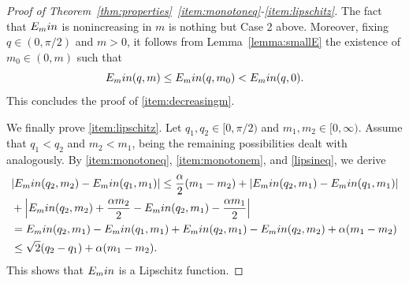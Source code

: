 \documentclass[10pt,a4paper]{amsart}
\newcommand{\Emin}{E_\textup{min}}
\begin{document}
\begin{proof}[Proof of Theorem~\ref{thm:properties}~\ref{item:monotoneq}-\ref{item:lipschitz}]
The fact that $\Emin$ is nonincreasing in $m$ is nothing but Case 2 above. Moreover, fixing $q\in(0,\pi/2)$ and $m>0$, it follows from Lemma~\ref{lemma:smallE} the existence of $m_0\in (0,m)$ such that
\[\Emin(q,m)\leq\Emin(q,m_0)<\Emin(q,0).\]
This concludes the proof of \ref{item:decreasingm}.

We finally prove \ref{item:lipschitz}. Let $q_1,q_2\in [0,\pi/2)$ and $m_1,m_2\in [0,\infty)$. Assume that $q_1<q_2$ and $m_2<m_1$, being the remaining possibilities dealt with analogously. By \ref{item:monotoneq}, \ref{item:monotonem}, and \eqref{lipsineq}, we derive
\begin{align*}
&|\Emin(q_2,m_2) -\Emin(q_1,m_1)|\leq \frac{\alpha}{2}(m_1-m_2)+|\Emin(q_2,m_1)-\Emin(q_1,m_1)|
\\
&+\Big|\Emin(q_2,m_2)+\frac{\alpha m_2}{2}-\Emin(q_2,m_1)-\frac{\alpha m_1}{2}\Big|
\\
&= \Emin(q_2,m_1)-\Emin(q_1,m_1)+\Emin(q_2,m_1)-\Emin(q_2,m_2)+\alpha(m_1-m_2)
\\
&\leq\sqrt{2}(q_2-q_1)+\alpha(m_1-m_2).
\end{align*}
This shows that $\Emin$ is a Lipschitz function. 
\end{proof}
\end{document}

